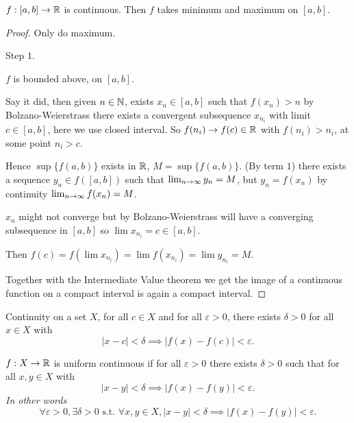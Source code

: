 \begin{theorem}\label{thm:IVT_maxmin}
    $f : [a, b] \to \mathbb{R}$ is continuous.
    Then $f$ takes minimum and maximum on $[a, b]$.
\end{theorem}
\begin{proof}
    Only do maximum.

    Step $1$.
    
    $f$ is bounded above,
    on $[a, b]$.

    Say it did,
    then given $n \in \mathbb{N}$,
    exists $x_n \in [a, b]$ such that $f(x_n) > n$ by Bolzano-Weierstrass there exists a convergent subsequence $x_{n_i}$ with limit $c \in [a, b]$,
    here we use closed interval.
    So $f(n_i) \to f(c) \in \mathbb{R}$ with $f(n_i) > n_i$,
    at some point $n_i > c$.

    Hence $\sup\{f(a, b)\}$ exists in $\mathbb{R}$,
    $M = \sup\{f(a, b)\}$.
    (By term $1$)
    there exists a sequence $y_n \in f([a, b])$ such that $\lim_{n \rightarrow \infty} y_n = M$,
    but $y_n = f(x_n)$ by continuity $\lim_{n \rightarrow \infty} f(x_n) = M$.

    $x_n$ might not converge but by Bolzano-Weierstrass will have a converging subsequence in $[a, b]$ so $\lim x_{n_i} = c \in [a, b]$.

    Then $f(c) = f(\lim x_{n_i}) = \lim f(x_{n_i}) = \lim y_{n_i} = M$.

    Together with the Intermediate Value theorem we get the image of a continuous function on a compact interval is again a compact interval.
\end{proof}

\begin{definition}\label{def:continuityonset}
    Continuity on a set $X$,
    for all $c \in X$ and for all $\varepsilon > 0$,
    there exists $\delta > 0$ for all $x \in X$ with
    \[
    |x - c| < \delta \implies |f(x) - f(c)| < \varepsilon.
    \]
\end{definition}

\begin{definition}\label{def:uniformcontinuity}
    $f : X \to \mathbb{R}$ is uniform continuous if for all $\varepsilon > 0$ there exists $\delta > 0$ such that for all $x, y \in X$ with
    \[
    |x - y| < \delta \implies |f(x) - f(y)| < \varepsilon.
    \]
    \textit{In other words}
    \[
    \forall \varepsilon > 0, \exists \delta > 0 \text{ s.t. } \forall x, y \in X, |x - y| < \delta \implies |f(x) - f(y)| < \varepsilon.
    \]
\end{definition}

